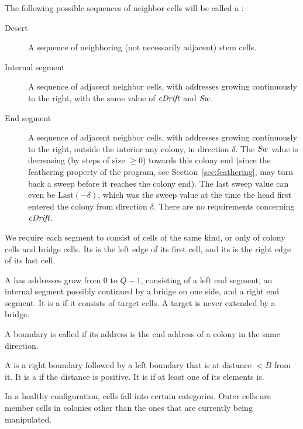 \documentclass[12pt]{memoir}
\renewcommand{\ge}{\geq}
\newcommand{\fld}[1]{\ensuremath{\textit{#1\/}}}
\def\B{B}
\newcommand{\cDrift}{\fld{cDrift}}
\newcommand{\Sweep}{\fld{Sw}}
\newcommand{\Last}{\mathrm{Last}}
\begin{document}
\begin{definition}[Segments]\label{def:segments}
The following possible sequences of neighbor cells will be called a :
\begin{description}
\item[Desert] A sequence of neighboring (not necessarily adjacent) 
stem cells.

\item[Internal segment]  A sequence of adjacent neighbor 
cells, with addresses growing continuously to the right, with 
the same value of  \( \cDrift \) and \( \Sweep \).

\item[End segment] A sequence of adjacent neighbor cells, with addresses growing
continuously to the right, outside the interior any colony, 
in direction \( \delta \).
The \( \Sweep \) value is decreasing (by steps of size \( \ge 0 \))  
towards this colony end (since the feathering property of the program,
see Section~\ref{sec:feathering}, may turn back a sweep
before it reaches the colony end).
The last sweep value can even be \( \Last(-\delta) \), which was the sweep value
at the time the head first entered the colony from direction \( \delta \).
There are no requirements concerning \( \cDrift \).
\end{description}

We require each segment to consist of cells of the same kind, or only of 
colony cells and bridge cells.
Its  is the left edge of its first cell, and its  is 
the right edge of its last cell.

A  has addresses grow from \( 0 \) to \( Q-1 \), 
consisting of a left end segment, 
an internal segment possibly continued by a bridge on one side,
and a right end segment.
It is a  if it consists of target cells.
A target is never extended by a bridge.

A boundary is called  if its address is the end 
address of a colony in the same direction.

A  
is a right boundary followed by a left boundary that is at distance \( <\B \) from it.
It is a  if the distance is positive.
It is  if at least one of its elements is.
\end{definition}

In a healthy configuration, cells fall into certain categories.
Outer cells are member cells in colonies other than the ones that 
are currently being manipulated.
\end{document}

